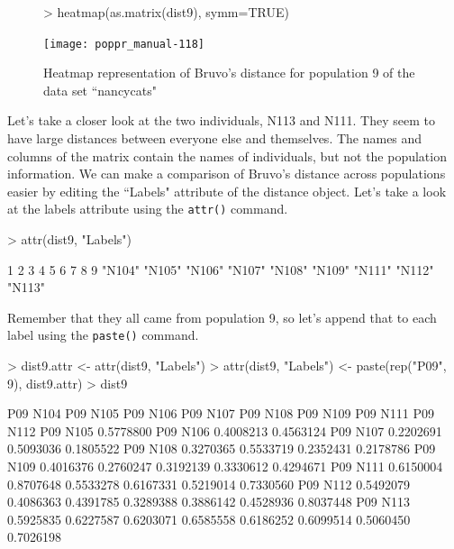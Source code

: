 \documentclass[letterpaper]{article}
\begin{document}
\begin{figure}[h!]
  \centering
  \caption{\footnotesize Heatmap representation of Bruvo's distance for population 9 of the data set ``nancycats"}
  \label{bruvo_heat_map}
\begin{Schunk}
\begin{Sinput}
> heatmap(as.matrix(dist9), symm=TRUE)
\end{Sinput}
\end{Schunk}
\texttt{[image: poppr\_manual-118]}
\end{figure}

Let's take a closer look at the two individuals, N113 and N111. They seem to have large distances between everyone else and themselves. The names and columns of the matrix contain the names of individuals, but not the population information. We can make a comparison of Bruvo's distance across populations easier by editing the ``Labels" attribute of the distance object. Let's take a look at the labels attribute using the \texttt{attr()} command. 
\begin{Schunk}
\begin{Sinput}
> attr(dist9, "Labels")
\end{Sinput}
\begin{Soutput}
     1      2      3      4      5      6      7      8      9 
"N104" "N105" "N106" "N107" "N108" "N109" "N111" "N112" "N113" 
\end{Soutput}
\end{Schunk}
Remember that they all came from population 9, so let's append that to each label using the \texttt{paste()} command. 
\begin{Schunk}
\begin{Sinput}
> dist9.attr <- attr(dist9, "Labels")
> attr(dist9, "Labels") <- paste(rep("P09", 9), dist9.attr)
> dist9
\end{Sinput}
\begin{Soutput}
          P09 N104  P09 N105  P09 N106  P09 N107  P09 N108  P09 N109  P09 N111  P09 N112
P09 N105 0.5778800                                                                      
P09 N106 0.4008213 0.4563124                                                            
P09 N107 0.2202691 0.5093036 0.1805522                                                  
P09 N108 0.3270365 0.5533719 0.2352431 0.2178786                                        
P09 N109 0.4016376 0.2760247 0.3192139 0.3330612 0.4294671                              
P09 N111 0.6150004 0.8707648 0.5533278 0.6167331 0.5219014 0.7330560                    
P09 N112 0.5492079 0.4086363 0.4391785 0.3289388 0.3886142 0.4528936 0.8037448          
P09 N113 0.5925835 0.6227587 0.6203071 0.6585558 0.6186252 0.6099514 0.5060450 0.7026198
\end{Soutput}
\end{Schunk}
\end{document}

